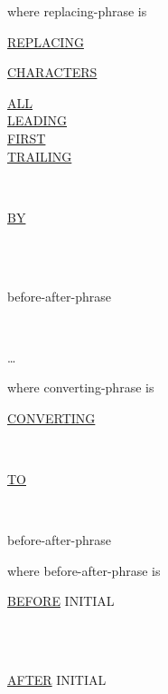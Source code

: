 \documentclass[a4paper,oneside,svgnames]{scrbook}
\makeatletter
\newcommand{\key}[1]{\underline{#1}}
\newenvironment{0-1}{$\left[ \begin{tabular}{@{}l@{}}}{\end{tabular} \right]$}
\newenvironment{0+}{$\left[\left| \begin{tabular}{@{}l@{}}}{\end{tabular} \right|\right]$}
\newenvironment{1=}{$\left\{ \begin{tabular}{@{}l@{}}}{\end{tabular} \right\}$}
\makeatother
\begin{document}
where replacing-phrase is

\key{REPLACING}
\begin{1=}
  \begin{1=}
    \key{CHARACTERS} \\

    \begin{0-1}
      \key{ALL} \\
      \key{LEADING} \\
      \key{FIRST} \\
      \key{TRAILING}
    \end{0-1}
    \begin{1=}
      \identifier \\
      \literal
    \end{1=}
  \end{1=}
  \key{BY}
  \begin{1=}
    \identifier \\
    \literal \\
  \end{1=}
  \begin{0-1}
    before-after-phrase
  \end{0-1} \\
\end{1=} \ldots

where converting-phrase is

\key{CONVERTING}
\begin{1=}
  \identifier \\
  \literal
\end{1=}
\key{TO}
\begin{1=}
  \identifier \\
  \literal
\end{1=}
\begin{0-1}
  before-after-phrase
\end{0-1}

where before-after-phrase is

\begin{0+}
  \key{BEFORE} INITIAL
  \begin{1=}
    \identifier \\
    \literal
  \end{1=} \\

  \key{AFTER} INITIAL
  \begin{1=}
    \identifier \\
    \literal
  \end{1=}
\end{0+}
\end{document}

